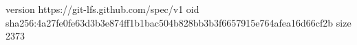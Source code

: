 version https://git-lfs.github.com/spec/v1
oid sha256:4a27fe0fe63d3b3e874ff1b1bac504b828bb3b3f6657915e764afea16d66cf2b
size 2373
